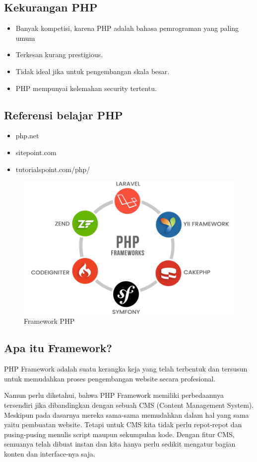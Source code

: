 \subsection{Kekurangan PHP}
\begin{itemize}
	\item Banyak kompetisi, karena PHP adalah bahasa pemrograman yang paling umum
	\item Terkesan kurang prestigious.
	\item Tidak ideal jika untuk pengembangan skala besar.
	\item PHP mempunyai kelemahan security tertentu.
\end{itemize}

\subsection{Referensi belajar PHP}
\begin{itemize}
	\item php.net
	\item sitepoint.com
	\item tutorialspoint.com/php/
\end{itemize}

	\begin{figure}[H]
		\includegraphics[width=12cm]{figures/web/phpframework.png}
		\centering
		\caption{Framework PHP}
	\end{figure}
\subsection{Apa itu Framework?}
PHP Framework adalah suatu kerangka keja yang telah terbentuk dan tersusun untuk memudahkan proses pengembangan website  secara profesional.

Namun perlu diketahui, bahwa PHP Framework memiliki perbedaannya tersendiri jika dibandingkan dengan sebuah CMS (Content Management System). Meskipun pada dasarnya mereka sama-sama memudahkan dalam hal yang sama yaitu pembuatan website. Tetapi untuk CMS  kita tidak perlu repot-repot dan pusing-pusing menulis script maupun sekumpulan kode. Dengan fitur CMS, semuanya telah dibuat instan dan kita hanya perlu sedikit mengatur bagian konten dan interface-nya saja.

